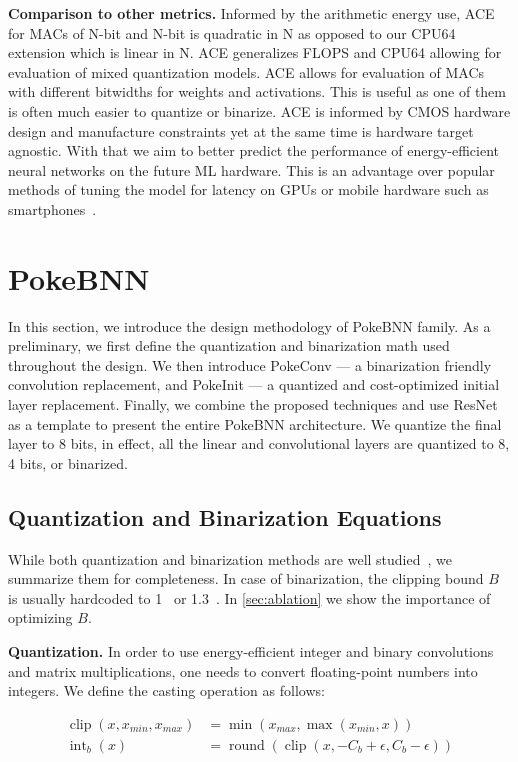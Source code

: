 \textbf{Comparison to other metrics.} Informed by the arithmetic energy use, ACE for MACs of N-bit and N-bit is quadratic in N as opposed to our CPU64 extension which is linear in N. ACE generalizes FLOPS and CPU64 allowing for evaluation of mixed quantization models. ACE allows for evaluation of MACs with different bitwidths for weights and activations. This is useful as one of them is often much easier to quantize or binarize. ACE is informed by CMOS hardware design and manufacture constraints yet at the same time is hardware target agnostic. With that we aim to better predict the performance of energy-efficient neural networks on the future ML hardware. This is an advantage over popular methods of tuning the model for latency on GPUs or mobile hardware such as smartphones~\cite{sandler2018mobilenetv2, howard2019mobilenetv3}. 

\section{PokeBNN} \label{sec:model}

In this section, we introduce the design methodology of PokeBNN family. As a preliminary, we first define the quantization and binarization math used throughout the design. We then introduce PokeConv --- a binarization friendly convolution replacement, and PokeInit --- a quantized and cost-optimized initial layer replacement.  Finally, we combine the proposed techniques and use ResNet as a template to present the entire PokeBNN architecture. We quantize the final layer to 8 bits, in effect, all the linear and convolutional layers are quantized to 8, 4 bits, or binarized.  

\subsection{Quantization and Binarization Equations} While both quantization and binarization methods are well studied~\cite{Abdolrashidi2021pareto, hubara2016bnn}, we summarize them for completeness. In case of binarization, the clipping bound $B$ is usually hardcoded to 1~\cite{hubara2016bnn} or 1.3~\cite{Bethge2021meliusnet}. In \ref{sec:ablation} we show the importance of optimizing $B$. 

\textbf{Quantization.}
In order to use energy-efficient integer and binary convolutions and matrix multiplications, one needs to convert floating-point numbers into integers. We define the casting operation as follows:

\begin{align*}
\operatorname{clip}(x, x_{min}, x_{max}) &= \operatorname{min}(x_{max}, \operatorname{max}(x_{min}, x)) \\
\operatorname{int}_b(x) &= \operatorname{round}(\operatorname{clip}(x, -C_b+\epsilon, C_b-\epsilon))
\end{align*}

